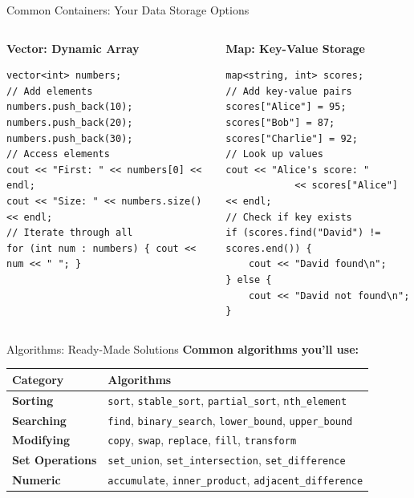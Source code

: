 \begin{frame}[fragile]{ Common Containers: Your Data Storage Options}
	\begin{columns}
		\begin{column}{0.5\textwidth}
			\textbf{Vector: Dynamic Array}
			\begin{verbatim}
vector<int> numbers;
// Add elements
numbers.push_back(10);
numbers.push_back(20);
numbers.push_back(30);
// Access elements
cout << "First: " << numbers[0] << endl;
cout << "Size: " << numbers.size() << endl;
// Iterate through all
for (int num : numbers) { cout << num << " "; }
			\end{verbatim}
		\end{column}
		\begin{column}{0.5\textwidth}
			\textbf{Map: Key-Value Storage}
			\begin{verbatim}
map<string, int> scores;
// Add key-value pairs
scores["Alice"] = 95;
scores["Bob"] = 87;
scores["Charlie"] = 92;
// Look up values
cout << "Alice's score: "
            << scores["Alice"] << endl;
// Check if key exists
if (scores.find("David") != scores.end()) {
    cout << "David found\n";
} else {
    cout << "David not found\n";
}
			\end{verbatim}
		\end{column}
	\end{columns}
\end{frame}

\begin{frame}[fragile]{ Algorithms: Ready-Made Solutions}
    \textbf{Common algorithms you'll use:}
    \begin{table}[]
        \begin{tabular}{|l|l|}
        \hline
        \textbf{Category}       & \textbf{Algorithms}                                                                 \\ \hline
        \textbf{Sorting}        & \texttt{sort}, \texttt{stable\_sort}, \texttt{partial\_sort}, \texttt{nth\_element} \\ \hline
        \textbf{Searching}      & \texttt{find}, \texttt{binary\_search}, \texttt{lower\_bound}, \texttt{upper\_bound} \\ \hline
        \textbf{Modifying}      & \texttt{copy}, \texttt{swap}, \texttt{replace}, \texttt{fill}, \texttt{transform}   \\ \hline
        \textbf{Set Operations} & \texttt{set\_union}, \texttt{set\_intersection}, \texttt{set\_difference}           \\ \hline
        \textbf{Numeric}        & \texttt{accumulate}, \texttt{inner\_product}, \texttt{adjacent\_difference}         \\ \hline
        \end{tabular}
    \end{table}
\end{frame}


